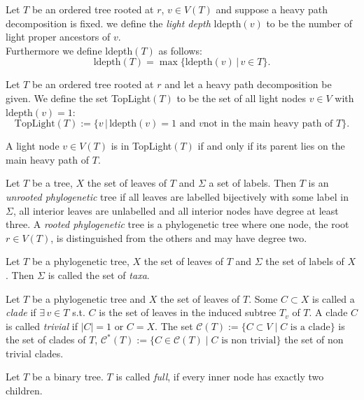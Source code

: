 \begin{defin}
Let $T$ be an ordered tree rooted at $r$, $v \in V(T)$ and suppose a heavy path decomposition is fixed. we define the \textit{light depth} ldepth$(v)$ to be the number of light proper ancestors of $v$.\\
Furthermore we define ldepth$(T)$ as follows:
$$\text{ldepth}(T) = \max \{\text{ldepth}(v) \,|\,v \in T\}.$$
\end{defin}
\begin{defin}
Let $T$ be an ordered tree rooted at $r$ and let a heavy path decomposition be given. We define the set TopLight$(T)$ to be the set of all light nodes $v \in V$ with ldepth$(v) = 1$:
$$\text{TopLight}(T) := \{v \,|\,\text{ldepth}(v)=1 \text{ and } v \text{not in the main heavy path of }T\}.$$
\end{defin}
\begin{rem}
A light node $v\in V(T)$ is in TopLight$(T)$ if and only if its parent lies on the main heavy path of $T$.
\end{rem}
\begin{defin} Let $T$ be a tree, $X$ the set of leaves of $T$ and $\Sigma$ a set of labels. Then $T$ is an \textit{unrooted phylogenetic} tree if all leaves are labelled bijectively with some label in $\Sigma$, all interior leaves are unlabelled and all interior nodes have degree at least three. A \textit{rooted phylogenetic} tree is a phylogenetic tree where one node, the root $r \in V(T)$, is distinguished from the others and may have degree two.  
\end{defin}
\begin{defin} Let $T$ be a phylogenetic tree, $X$ the set of leaves of $T$ and $\Sigma$ the set of labels of $X$. Then $\Sigma$ is called the set of \textit{taxa}. 
\end{defin}
\begin{defin} Let $T$ be a phylogenetic tree and $X$ the set of leaves of $T$. Some $C \subset X$ is called a \textit{clade} if $\exists \,v \in T$ s.t. $C$ is the set of leaves in the induced subtree $T_v$ of $T$. A clade $C$ is called \textit{trivial} if $|C|=1$ or $C = X$. The set $\mathcal{C}(T) := \{C \subset V\;|\; C\text{ is a clade}\}$ is the set of clades of $T$, $\mathcal{C}^*(T) := \{C \in \mathcal{C}(T)\;|\; C\text{ is non trivial}\}$ the set of non trivial clades.
\end{defin}
\begin{defin} Let $T$ be a binary tree. $T$ is called \textit{full}, if every inner node has exactly two children.
\end{defin}


